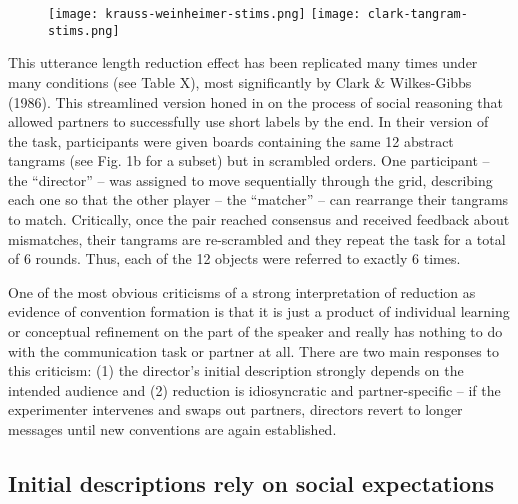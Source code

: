 \documentclass[11pt, floatsintext, man]{apa6}
\begin{document}
\begin{figure}
\centering
\texttt{[image: krauss-weinheimer-stims.png]}
\texttt{[image: clark-tangram-stims.png]}
\caption{}
\end{figure}

This utterance length reduction effect has been replicated many times under many conditions (see Table X), most significantly by Clark \& Wilkes-Gibbs (1986). This streamlined version honed in on the process of social reasoning that allowed partners to successfully use short labels by the end. In their version of the task, participants were given boards containing the same 12 abstract tangrams (see Fig. 1b for a subset) but in scrambled orders. One participant -- the ``director'' -- was assigned to move sequentially through the grid, describing each one so that the other player -- the ``matcher'' -- can rearrange their tangrams to match. Critically, once the pair reached consensus and received feedback about mismatches, their tangrams are re-scrambled and they repeat the task for a total of 6 rounds. Thus, each of the 12 objects were referred to exactly 6 times. 


One of the most obvious criticisms of a strong interpretation of reduction as evidence of convention formation is that it is just a product of individual learning or conceptual refinement on the part of the speaker and really has nothing to do with the communication task or partner at all. There are two main responses to this criticism: (1) the director's initial description strongly depends on the intended audience and (2) reduction is idiosyncratic and partner-specific -- if the experimenter intervenes and swaps out partners, directors revert to longer messages until new conventions are again established. 

\subsection{Initial descriptions rely on social expectations}
\end{document}
